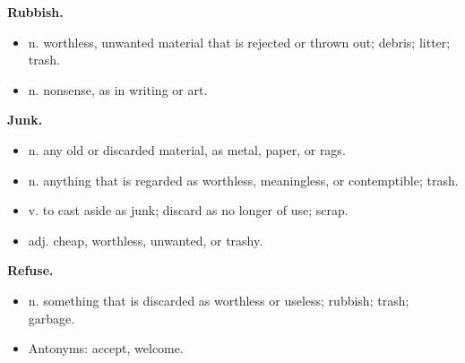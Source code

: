 \noindent\textbf{Rubbish.}
\begin{itemize}
\item n. worthless, unwanted material that is rejected or thrown out; debris; litter; trash.
\item n. nonsense, as in writing or art.
\end{itemize}

\noindent\textbf{Junk.}
\begin{itemize}
\item n. any old or discarded material, as metal, paper, or rags.
\item n. anything that is regarded as worthless, meaningless, or contemptible; trash.
\item v. to cast aside as junk; discard as no longer of use; scrap.
\item adj. cheap, worthless, unwanted, or trashy.
\end{itemize}

\noindent\textbf{Refuse.}
\begin{itemize}
\item n. something that is discarded as worthless or useless; rubbish; trash; garbage.
\item Antonyms: accept, welcome.
\end{itemize}
